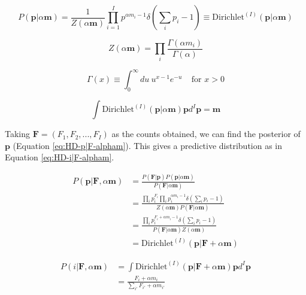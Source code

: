 \begin{equation}
P(\boldsymbol{p}|\alpha\boldsymbol{m})=\frac{1}{Z(\alpha\boldsymbol{m})}\prod_{i=1}^{I}p^{\alpha m_{i}-1}\delta\left(\sum_{i}p_{i}-1\right)\equiv \text{Dirichlet}^{(I)}(\boldsymbol{p}|\alpha\boldsymbol{m})
\label{eq:HD-Dir-p|alpha-m}
\end{equation}

\begin{equation}
Z(\alpha\boldsymbol{m})=\prod_{i}\frac{\Gamma(\alpha m_{i})}{\Gamma(\alpha)}
\label{eq:HD-Z}
\end{equation}

\begin{equation}
\Gamma(x)\equiv\int_{0}^{\infty}du\ u^{x-1}e^{-u} \ \ \ \ \ \text{for }x>0
\label{eq:HD-Gamma}
\end{equation}

\begin{equation}
\int\text{Dirichlet}^{(I)}(\boldsymbol{p}|\alpha\boldsymbol{m})\boldsymbol{p}d^{I}\boldsymbol{p}=\boldsymbol{m}
\label{eq:HD-DirMean}
\end{equation}

Taking $\boldsymbol{F}=(F_{1},F_{2},...,F_{I})$ as the counts obtained, we can find the posterior of $\boldsymbol{p}$ (Equation \ref{eq:HD-p|F-alpham}). This gives a predictive distribution as in Equation \ref{eq:HD-i|F-alpham}.

\begin{align}
P(\boldsymbol{p}|\boldsymbol{F},\alpha\boldsymbol{m})&=\frac{P(\boldsymbol{F}|\boldsymbol{p})P(\boldsymbol{p}|\alpha\boldsymbol{m})}{P(\boldsymbol{F}|\alpha\boldsymbol{m})} \nonumber
\\
&=\frac{\prod_{i}p_{i}^{F_{i}}\prod_{i}p_{i}^{\alpha m_{i}-1}\delta(\sum_{i}p_{i}-1)}{Z(\alpha\boldsymbol{m})P(\boldsymbol{F}|\alpha\boldsymbol{m})} \nonumber
\\
&=\frac{\prod_{i}p_{i}^{F_{i}+\alpha m_{i}-1}\delta(\sum_{i}p_{i}-1)}{P(\boldsymbol{F}|\alpha\boldsymbol{m})Z(\alpha\boldsymbol{m})} \nonumber
\\
&=\text{Dirichlet}^{(I)}(\boldsymbol{p}|\boldsymbol{F}+\alpha\boldsymbol{m})
\label{eq:HD-p|F-alpham}
\end{align}

\begin{align}
P(i|\boldsymbol{F},\alpha\boldsymbol{m})&=\int\text{Dirichlet}^{(I)}(\boldsymbol{p}|\boldsymbol{F}+\alpha\boldsymbol{m})\boldsymbol{p}d^{I}\boldsymbol{p} \nonumber
\\
&=\frac{F_{i}+\alpha m_{i}}{\sum_{i'}F_{i'}+\alpha m_{i'}}
\label{eq:HD-i|F-alpham}
\end{align}

